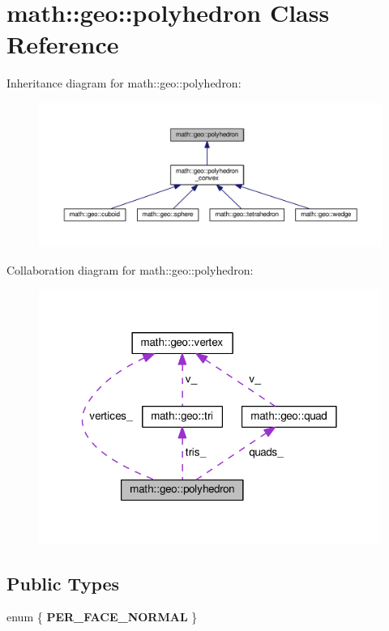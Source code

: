 \hypertarget{classmath_1_1geo_1_1polyhedron}{\section{math\-:\-:geo\-:\-:polyhedron Class Reference}
\label{classmath_1_1geo_1_1polyhedron}
}


Inheritance diagram for math\-:\-:geo\-:\-:polyhedron\-:
\nopagebreak
\begin{figure}[H]
\begin{center}
\leavevmode
\includegraphics[width=350pt]{classmath_1_1geo_1_1polyhedron__inherit__graph}
\end{center}
\end{figure}


Collaboration diagram for math\-:\-:geo\-:\-:polyhedron\-:
\nopagebreak
\begin{figure}[H]
\begin{center}
\leavevmode
\includegraphics[width=315pt]{classmath_1_1geo_1_1polyhedron__coll__graph}
\end{center}
\end{figure}
\subsection*{Public Types}
\begin{DoxyCompactItemize}
\item 
enum \{ {\bfseries P\-E\-R\-\_\-\-F\-A\-C\-E\-\_\-\-N\-O\-R\-M\-A\-L}
 \}
\end{DoxyCompactItemize}
